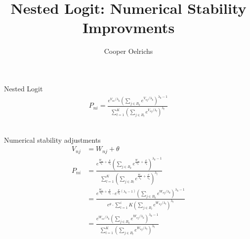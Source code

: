 \documentclass[20pt]{extarticle}
\begin{document}
\title{Nested Logit: Numerical Stability Improvments}
\author{Cooper Oelrichs}

Nested Logit
\begin{align}
  P_{ni}=
  \frac{e^{V_{ni}/\lambda_{k}}
  \left(\sum_{j\in B_{k}}e^{V_{nj}/\lambda_{k}}\right)
  ^{\lambda_{k}-1}}
  {\sum_{l=1}^{K}\left(\sum_{j\in B_{l}}
  e^{V_{nj}/\lambda_{l}}\right)^{\lambda_{l}}}
\end{align}

\\
Numerical stability adjustments
\begin{align}
  V_{nj} &= W_{nj} + \theta
  \\
  P_{ni} &= \frac{
    e^{ \frac{W_{ni}}{\lambda_{k}} + \frac{\theta}{\lambda_{k}} }
    \left(\sum_{j\in B_{k}}
    e^{ \frac{W_{ni}}{\lambda_{k}} + \frac{\theta}{\lambda_{k}} }
    \right)
    ^{\lambda_{k}-1}
  }
  {
    \sum_{l=1}^{K}\left(\sum_{j\in B_{l}}
    e^{ \frac{W_{ni}}{\lambda_{k}} + \frac{\theta}{\lambda_{k}} }
    \right)^{\lambda_{l}}
  }
  \\
  &= \frac{
    e^{ \frac{W_{ni}}{\lambda_{k}} + \frac{\theta}{\lambda_{k}} }
    \cdot
    e^{ \frac{\theta}{\lambda_{k}} (\lambda_{k}-1) }
    \left(\sum_{j\in B_{k}}e^{W_{nj}/\lambda_{k}}\right)
    ^{\lambda_{k}-1}
  }
  {
    e^\theta \cdot
    {\sum_{l=1}^i{K}\left(\sum_{j\in B_{l}}
    e^{W_{nj}/\lambda_{l}}\right)^{\lambda_{l}}}
  }
  \\
  &= \frac{
      e^{ W_{ni} / \lambda_{k} }
      \left(\sum_{j\in B_{k}}e^{W_{nj}/\lambda_{k}}\right)
      ^{\lambda_{k}-1}
    }
    {
      {\sum_{l=1}^{K}\left(\sum_{j\in B_{l}}
      e^{W_{nj}/\lambda_{l}}\right)^{\lambda_{l}}}
    }
\end{align}
\end{document}
